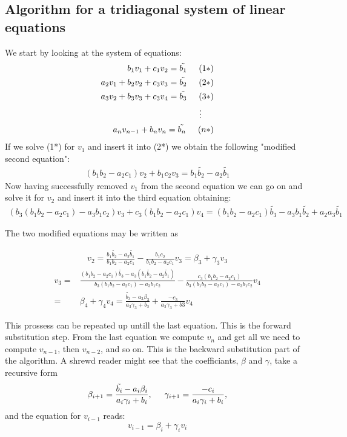 \documentclass[11pt,a4paper,english]{article}
\newcommand{\spac}{\hspace{5mm}}
\begin{document}
\newpage

\subsection*{Algorithm for a tridiagonal system of linear equations}

We start by looking at the system of equations:
\begin{align*}
	 b_1 v_1 + c_1 v_{2} = \tilde{b_1} \spac (1*)\\
	 a_2 v_1 + b_2 v_2 + c_3 v_3 = \tilde{b_2} \spac (2*) \\
	 a_3 v_2 + b_3 v_3 + c_3 v_4 = \tilde{b_3} \spac (3*) \\
	 \vdots \spac  \\ 
	 a_n v_{n-1} + b_n v_n = \tilde{b_n} \spac (n*)\\
\end{align*}
If we solve (1*) for $v_1$ and insert it into (2*) we obtain the following "modified second equation":
\begin{align*}
	(b_1 b_2 - a_2 c_1)v_2 + b_1 c_2 v_3 = b_1 \tilde{b_2} - a_2  \tilde{b_1}  
\end{align*}
Now having successfully removed $v_1$ from the second equation we can go on and solve it for $v_2$ and insert it into the third equation obtaining:
\begin{align*}
(b_3 (b_1 b_2 - a_2 c_1)- a_3 b_1 c_2)v_3 + c_3(b_1 b_2 -a_2 c_1)v_4 = (b_1 b_2 - a_2 c_1 ) \tilde{b_3} - a_3 b_1 \tilde{b_2} + a_2 a_3 \tilde{b_1} 
\end{align*}

The two modified equations may be written as 

\begin{align*}
v_2 = \frac{b_1 \tilde{b_2} - a_2 \tilde{b_1}}{b_1 b_2 - a_2 c_1} - \frac{b_1 c_2}{b_1 b_2 - a_2 c_1} v_3 = \beta_3 + \gamma_3 v_3
\end{align*}
\begin{align*}
v_3 =& \frac{(b_1 b_2 - a_2 c_1) \tilde{b_3} - a_3 (b_1 \tilde{b_2} - a_2 \tilde{b_1})}{b_3 (b_1 b_2 - a_2 c_1)- a_3 b_1 c_2} - \frac{c_3(b_1 b_2 - a_2 c_1)}{b_3 (b_1 b_2 - a_2 c_1)- a_3 b_1 c_2} v_4 \\
=& \beta_4 + \gamma_4 v_4 = \frac{\tilde{b_3}-a_3 \beta_3}{a_3 \gamma_3 + b_3} + \frac{-c_3}{a_3 \gamma_3 + b3}v_4
\end{align*}

This prossess can be repeated up untill the last equation. This is the forward substitution step. From the last equation we compute $v_n$ and get all we need to compute $v_{n-1}$, then $v_{n-2}$, and so on. This is the backward substitution part of the algorithm. A shrewd reader might see that the coefficiants, $\beta$ and $\gamma$, take a recursive form
\begin{align*}
\beta_{i+1} = \frac{\tilde{b_i}-a_i \beta_i}{a_i \gamma_i + b_i} , \spac \gamma_{i+1}=\frac{-c_i}{a_i \gamma_i + b_i},
\end{align*}
and the equation for $v_{i-1}$ reads: 
\begin{equation}
v_{i-1} = \beta_i + \gamma_i v_i
\end{equation}
\end{document}
